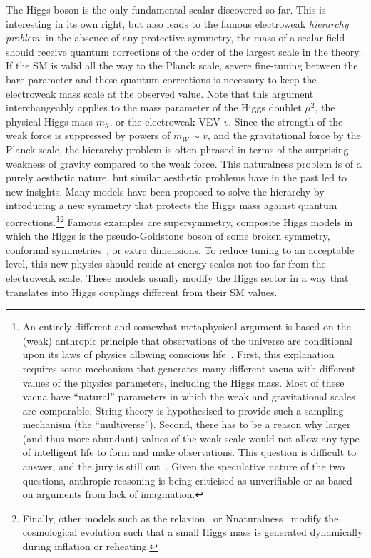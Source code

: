 The Higgs boson is the only fundamental scalar discovered so far. This
is interesting in its own right, but also leads to the famous
electroweak \emph{hierarchy problem}: in the absence of any protective
symmetry, the mass of a scalar field should receive quantum
corrections of the order of the largest scale in the theory. If the SM
is valid all the way to the Planck scale, severe fine-tuning between
the bare parameter and these quantum corrections is necessary to keep
the electroweak mass scale at the observed value. Note that this
argument interchangeably applies to the mass parameter of the Higgs
doublet $\mu^2$, the physical Higgs mass $m_h$, or the electroweak VEV
$v$. Since the strength of the weak force is suppressed by powers of
$m_W \sim v$, and the gravitational force by the Planck scale, the
hierarchy problem is often phrased in terms of the surprising weakness
of gravity compared to the weak force. This naturalness problem is of
a purely aesthetic nature, but similar aesthetic problems have in the
past led to new insights. Many models have been proposed to solve the
hierarchy by introducing a new symmetry that protects the Higgs mass
against quantum corrections.\footnote{An entirely different and
  somewhat metaphysical argument is based on the (weak) anthropic
  principle that observations of the universe are conditional upon its
  laws of physics allowing conscious life~\cite{Weinberg:1987dv,
    Barrow:1988yia}. First, this explanation requires some mechanism
  that generates many different vacua with different values of the
  physics parameters, including the Higgs mass. Most of these vacua
  have ``natural'' parameters in which the weak and gravitational
  scales are comparable. String theory is hypothesised to provide such
  a sampling mechanism (the ``multiverse''). Second, there has to be a
  reason why larger (and thus more abundant) values of the weak scale
  would not allow any type of intelligent life to form and make
  observations. This question is difficult to answer, and the jury is
  still out~\cite{Agrawal:1997gf, Harnik:2006vj, Clavelli:2006di,
    Giudice:2008bi, Donoghue:2009me, Gedalia:2010iy,
    Adams:2015hvd}. Given the speculative nature of the two questions,
  anthropic reasoning is being criticised as unverifiable or as based
  on arguments from lack of imagination.}\footnote{Finally, other
  models such as the relaxion~\cite{Graham:2015cka} or
  Nnaturalness~\cite{Arkani-Hamed:2016rle} modify the cosmological
  evolution such that a small Higgs mass is generated dynamically
  during inflation or reheating.} Famous examples are
supersymmetry, composite Higgs models in which the Higgs is the
pseudo-Goldstone boson of some broken symmetry, conformal
symmetries~\cite{Bardeen:1995kv}, or extra dimensions. To reduce
tuning to an acceptable level, this new physics should reside at
energy scales not too far from the electroweak scale. These models
usually modify the Higgs sector in a way that translates into Higgs
couplings different from their SM values.

